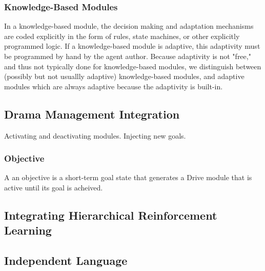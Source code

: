 \subsubsection{Knowledge-Based Modules}

In a knowledge-based module, the decision making and adaptation
mechanisms are coded explicitly in the form of rules, state machines,
or other explicitly programmed logic.  If a knowledge-based module is
adaptive, this adaptivity must be programmed by hand by the agent
author.  Because adaptivity is not "free," and thus not typically done
for knowledge-based modules, we distinguish between (possibly but not
usuallly adaptive) knowledge-based modules, and adaptive modules which
are always adaptive because the adaptivity is built-in.

\subsection{Drama Management Integration}

Activating and deactivating modules. Injecting new goals.

\subsubsection{Objective}

A an objective is a short-term goal state that generates a Drive module
that is active until its goal is acheived.

\subsection{Integrating Hierarchical Reinforcement Learning}

\subsection{Independent Language}
